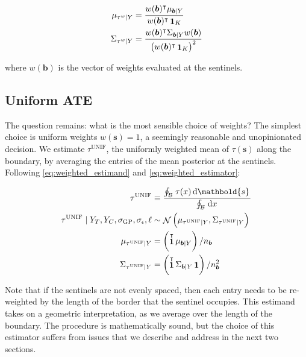 \documentclass[letter]{article}
\DeclareMathOperator{\normal}{\mathcal{N}}
\DeclareMathOperator{\ones}{\mathbf{1}}
\newcommand{\trans}{^{\intercal}}
\newcommand{\sigmaf}{\sigma_{\mathrm{GP}}}
\newcommand{\sigman}{\sigma_{\epsilon}}
\newcommand{\svec}{\mathbold{s}}
\newcommand{\boundary}{\mathcal{B}}
\newcommand{\sentinels}{\bm{b}}
\newcommand{\tauw}{\tau^{w}}
\newcommand{\unifavg}{\tau^{\mathrm{UNIF}}}
\newcommand{\eqlabel}[1]{\label{#1}}
\begin{document}
\begin{equation}\begin{split}
    \mu_{\tauw \mid Y} &= \frac{w(\sentinels)\trans \mu_{\sentinels \mid Y}}
                               {w(\sentinels)\trans  \ones_K} \\
    \Sigma_{\tauw \mid Y} &= \frac{w(\sentinels)\trans \Sigma_{\sentinels \mid Y} w(\sentinels)}
                                  { \del{w(\sentinels)\trans  \ones_K }^2 }\\
\end{split}
\eqlabel{eq:weighted_estimator}
\end{equation}

where \(w(\sentinels)\) is the vector of weights evaluated at the sentinels.
    


    	\subsection{Uniform ATE}\label{uniform-ate}

The question remains: what is the most sensible choice of weights?
The simplest choice is uniform weights \(w(\svec)=1\), a seemingly reasonable and unopinionated decision.
We estimate \(\unifavg\), the uniformly weighted mean of \(\tau(\svec)\) along the boundary, by averaging the entries of the mean posterior at the sentinels.
Following \eqref{eq:weighted_estimand} and \eqref{eq:weighted_estimator}:

\begin{equation}\begin{split}
    \unifavg &\equiv \frac{\oint_\boundary \left. \tau(x) \dif \svec \right.}
                          {\oint_\boundary \left. \dif x \right.} \\
    \unifavg \mid Y_T, Y_C, \sigmaf, \sigman, \ell &\sim \normal\del{\mu_{\unifavg \mid Y}, \Sigma_{\unifavg \mid Y}} \\
    \mu_{\unifavg \mid Y} &= \del{\ones\trans \mu_{\sentinels \mid Y}} / n_{\sentinels} \\
    \Sigma_{\unifavg \mid Y} &= \del{\ones\trans \Sigma_{\sentinels \mid Y} \ones} / n_{\sentinels}^2
\end{split}
\eqlabel{eq:unifavg}
\end{equation}

Note that if the sentinels are not evenly spaced, then each entry needs to be re-weighted by the length of the border that the sentinel occupies.
This estimand takes on a geometric interpretation, as we average over the length of the boundary.
The procedure is mathematically sound, but the choice of this estimator suffers from issues that we describe and address in the next two sections.
    
\end{document}
